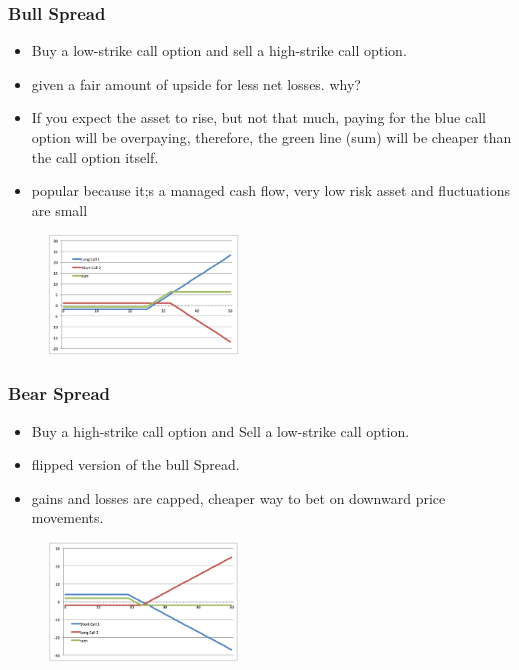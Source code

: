 \begin{multicols}{2}
\subsubsection{Bull Spread}
\begin{itemize}
    \item Buy a low-strike call option and sell a high-strike call option.
    \item given a fair amount of upside for less net losses. why?
    \item If you expect the asset to rise, but not that much, paying for the blue call option will be overpaying, therefore, the green line (sum) will be cheaper than the call option itself. 
    \item popular because it;s a managed cash flow, very low risk asset and fluctuations are small
\end{itemize}
\begin{figure}[H]
    \centering 
    \includegraphics[width =0.45\textwidth]{Figure/bull.png}
\end{figure}

\subsubsection{Bear Spread}
\begin{itemize}
    \item Buy a high-strike call option and Sell a low-strike call option.
    \item flipped version of the bull Spread.
    \item gains and losses are capped, cheaper way to bet on downward price movements. 
\end{itemize}
\begin{figure}[H]
    \centering 
    \includegraphics[width =0.45\textwidth]{Figure/bear.png}
\end{figure}


\end{multicols}
